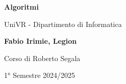 \begin{titlepage}
	\begin{center}
		\vspace*{1cm}

		\Huge
		\textbf{Algoritmi}

		\vspace{0.5cm}
		\LARGE
		UniVR - Dipartimento di Informatica

		\vspace{1.5cm}

		\textbf{Fabio Irimie, Legion}

		\vfill


		\vspace{0.8cm}

    Corso di Roberto Segala

		1° Semestre 2024/2025

	\end{center}
\end{titlepage}
